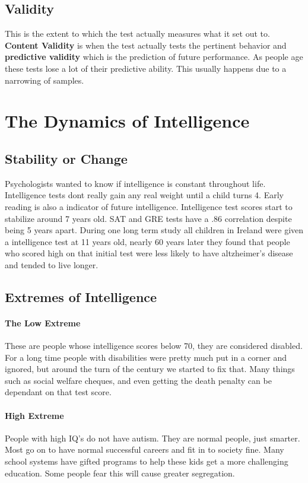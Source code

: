 \documentclass[12pt]{article}
\begin{document}
\subsection*{Validity}
This is the extent to which the test actually measures what it set out to. \textbf{Content Validity} is when the test actually tests the pertinent behavior and \textbf{predictive validity} which is the prediction of future performance. As people age these tests lose a lot of their predictive ability. This usually happens due to a narrowing of samples.
\section*{The Dynamics of Intelligence}
\subsection*{Stability or Change}
Psychologists wanted to know if intelligence is constant throughout life. Intelligence tests dont really gain any real weight until a child turns 4. Early reading is also a indicator of future intelligence. Intelligence test scores start to stabilize around 7 years old. SAT and GRE tests have a .86 correlation despite being 5 years apart. During one long term study all children in Ireland were given a intelligence test at 11 years old, nearly 60 years later they found that people who scored high on that initial test were less likely to have altzheimer's disease and tended to live longer. 
\subsection*{Extremes of Intelligence}
\paragraph*{The Low Extreme} These are people whose intelligence scores below 70, they are considered disabled. For a long time people with disabilities were pretty much put in a corner and ignored, but around the turn of the century we started to fix that. Many things such as social welfare cheques, and even getting the death penalty can be dependant on that test score.
\paragraph*{High Extreme} People with high IQ's do not have autism. They are normal people, just smarter. Most go on to have normal successful careers and fit in to society fine. Many school systems have gifted programs to help these kids get a more challenging education. Some people fear this will cause greater segregation. 
\end{document}

